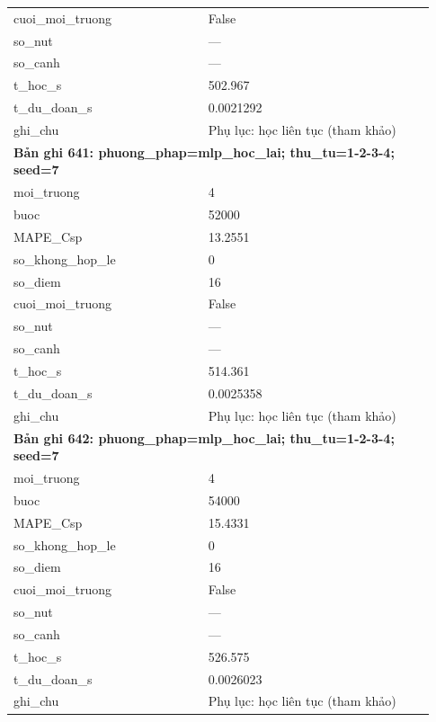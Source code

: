 \begin{longtable}{p{0.43\linewidth}p{0.50\linewidth}}
cuoi\_\allowbreak moi\_\allowbreak truong & False \\
so\_\allowbreak nut & — \\
so\_\allowbreak canh & — \\
t\_\allowbreak hoc\_\allowbreak s & 502.967 \\
t\_\allowbreak du\_\allowbreak doan\_\allowbreak s & 0.0021292 \\
ghi\_\allowbreak chu & Phụ lục: học liên tục (tham khảo) \\
\midrule
\multicolumn{2}{p{0.95\linewidth}}{\textbf{Bản ghi 641: phuong\_phap=mlp\_hoc\_lai; thu\_tu=1-2-3-4; seed=7}} \\
moi\_\allowbreak truong & 4 \\
buoc & 52000 \\
MAPE\_\allowbreak Csp & 13.2551 \\
so\_\allowbreak khong\_\allowbreak hop\_\allowbreak le & 0 \\
so\_\allowbreak diem & 16 \\
cuoi\_\allowbreak moi\_\allowbreak truong & False \\
so\_\allowbreak nut & — \\
so\_\allowbreak canh & — \\
t\_\allowbreak hoc\_\allowbreak s & 514.361 \\
t\_\allowbreak du\_\allowbreak doan\_\allowbreak s & 0.0025358 \\
ghi\_\allowbreak chu & Phụ lục: học liên tục (tham khảo) \\
\midrule
\multicolumn{2}{p{0.95\linewidth}}{\textbf{Bản ghi 642: phuong\_phap=mlp\_hoc\_lai; thu\_tu=1-2-3-4; seed=7}} \\
moi\_\allowbreak truong & 4 \\
buoc & 54000 \\
MAPE\_\allowbreak Csp & 15.4331 \\
so\_\allowbreak khong\_\allowbreak hop\_\allowbreak le & 0 \\
so\_\allowbreak diem & 16 \\
cuoi\_\allowbreak moi\_\allowbreak truong & False \\
so\_\allowbreak nut & — \\
so\_\allowbreak canh & — \\
t\_\allowbreak hoc\_\allowbreak s & 526.575 \\
t\_\allowbreak du\_\allowbreak doan\_\allowbreak s & 0.0026023 \\
ghi\_\allowbreak chu & Phụ lục: học liên tục (tham khảo) \\

\end{longtable}
